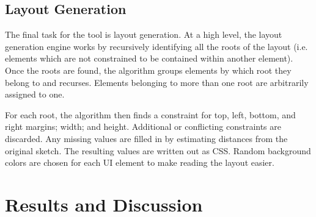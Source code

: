 \documentclass{article}
\begin{document}
\subsection{Layout Generation}
\label{sec:layout-gen}

The final task for the tool is layout generation. At a high level, the layout
generation engine works by recursively identifying all the roots of the layout
(i.e. elements which are not constrained to be contained within another
element). Once the roots are found, the algorithm groups elements by which root
they belong to and recurses. Elements belonging to more than one root are
arbitrarily assigned to one.

For each root, the algorithm then finds a constraint for top, left, bottom, and
right margins; width; and height. Additional or conflicting constraints are
discarded. Any missing values are filled in by estimating distances from the
original sketch. The resulting values are written out as CSS. Random background
colors are chosen for each UI element to make reading the layout easier.

\section{Results and Discussion}
\end{document}
